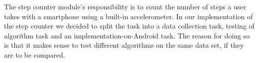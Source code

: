 
The step counter module's responsibility is to count the number of steps a user takes with a smartphone using a built-in accelerometer. In our implementation of the step counter we decided to split the task into a data collection task, testing of algorithm task and an implementation-on-Android task. The reason for doing so is that it makes sense to test different algorithms on the same data set, if they are to be compared.